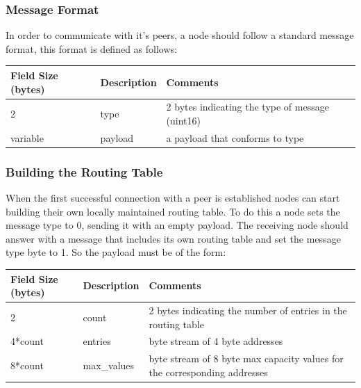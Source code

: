 \subsubsection{Message Format}

In order to communicate with it's peers, a node should follow a standard message format, this format is defined as follows:

\begin{table}[H]
\begin{tabular}{|l|l|l|}
\hline
\rowcolor[HTML]{C0C0C0} 
Field Size (bytes) & Description & Comments                            \\ \hline
2                  & type        & 2 bytes indicating the type of message (uint16) \\ \hline
variable           & payload     & a payload that conforms to type           \\ \hline
\end{tabular}
\end{table}

\subsubsection{Building the Routing Table}
\label{sssec:build_table}

When the first successful connection with a peer is established nodes can start building their own locally maintained routing table. To do this a node sets the message type to 0, sending it with an empty payload. The receiving node should answer with a message that includes its own routing table and set the message type byte to 1. So the payload must be of the form:

\begin{table}[H]
\begin{tabular}{|l|l|l|}
\hline
\rowcolor[HTML]{C0C0C0} 
Field Size (bytes) & Description & Comments                                                                               \\ \hline
2                  & count       & 2 bytes indicating the number of entries in the routing table             \\ \hline
4*count            & entries     & byte stream of 4 byte addresses                                          \\ \hline
8*count            & max\_values & byte stream of 8 byte max capacity values for the corresponding addresses \\ \hline
\end{tabular}
\end{table}

